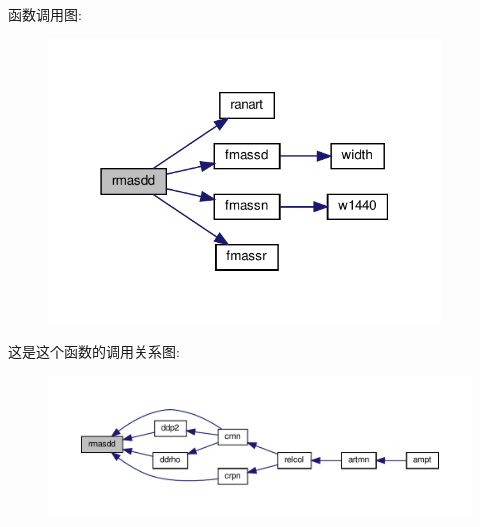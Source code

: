 函数调用图\+:
\nopagebreak
\begin{figure}[H]
\begin{center}
\leavevmode
\includegraphics[width=295pt]{rmasdd_8f90_afd0efb44d15ea73adfd5724f7f135ec5_cgraph}
\end{center}
\end{figure}
这是这个函数的调用关系图\+:
\nopagebreak
\begin{figure}[H]
\begin{center}
\leavevmode
\includegraphics[width=350pt]{rmasdd_8f90_afd0efb44d15ea73adfd5724f7f135ec5_icgraph}
\end{center}
\end{figure}
